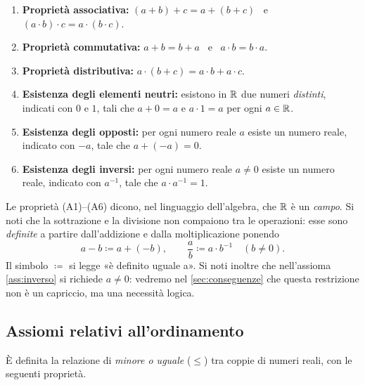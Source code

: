 \begin{assioma}\label{ass:operazioni}
\leavevmode
\begin{enumerate}[label=\textup{(A\arabic*)}, ref=(A\arabic*), leftmargin=3em]
  \item\label{ass:associativa} \textbf{Proprietà associativa:}
    $(a+b)+c=a+(b+c)$ \ e \ $(a\cdot b)\cdot c=a\cdot(b\cdot c)$.
  \item\label{ass:commutativa} \textbf{Proprietà commutativa:}
    $a+b=b+a$ \ e \ $a\cdot b=b\cdot a$.
  \item\label{ass:distributiva} \textbf{Proprietà distributiva:}
    $a\cdot(b+c)=a\cdot b+a\cdot c$.
  \item\label{ass:neutri} \textbf{Esistenza degli elementi neutri:} esistono in $\mathbb{R}$ due
    numeri \emph{distinti}, indicati con $0$ e $1$, tali che $a+0=a$ e $a\cdot1=a$ per
    ogni $a\in\mathbb{R}$.
  \item\label{ass:opposto} \textbf{Esistenza degli opposti:} per ogni numero reale $a$
    esiste un numero reale, indicato con $-a$, tale che $a+(-a)=0$.
  \item\label{ass:inverso} \textbf{Esistenza degli inversi:} per ogni numero reale
    $a\neq0$ esiste un numero reale, indicato con $a^{-1}$, tale che $a\cdot a^{-1}=1$.
\end{enumerate}
\end{assioma}

\begin{osservazione}
Le proprietà (A1)--(A6) dicono, nel linguaggio dell'algebra, che $\mathbb{R}$ è un
\emph{campo}. Si noti che la sottrazione e la divisione non compaiono tra le
operazioni: esse sono \emph{definite} a partire dall'addizione e dalla moltiplicazione
ponendo
\[
  a-b \coloneqq a+(-b), \qquad \frac{a}{b}\coloneqq a\cdot b^{-1}\quad(b\neq0).
\]
Il simbolo $\coloneqq$ si legge «è definito uguale a». Si noti inoltre che nell'assioma
\ref{ass:inverso} si richiede $a\neq0$: vedremo nel \cref{sec:conseguenze} che questa
restrizione non è un capriccio, ma una necessità logica.
\end{osservazione}

\subsection{Assiomi relativi all'ordinamento}

È definita la relazione di \emph{minore o uguale} ($\le$) tra coppie di numeri reali,
con le seguenti proprietà.

